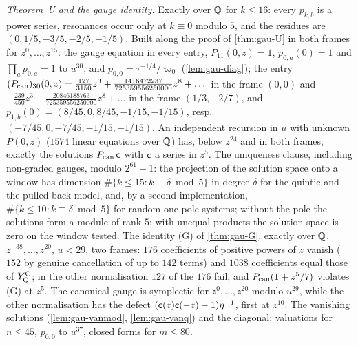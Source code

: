\emph{Theorem~U and the gauge identity.} Exactly over $\mathbb{Q}$ for $k\leq 16$: every $p_{k,b}$ is a power series, resonances occur only at $k\equiv 0$ modulo $5$, and the residues are $(0,1/5,-3/5,-2/5,-1/5)$. Built along the proof of \cref{thm:gau-U} in both frames for $z^0,\dots,z^{15}$: the gauge equation in every entry, $P_{11}(0,z)=1$, $p_{0,a}(0)=1$ and $\prod_ap_{0,a}=1$ to $u^{30}$, and $p_{0,0}=\tau^{-1/4}/\varpi_0$ (\cref{lem:gau-diag}); the entry $(P_{\mathrm{can}})_{30}(0,z)=\tfrac{127}{3150}z^3+\tfrac{1416472237}{725359556250000}z^8+\dots$ in the frame $(0,0)$ and $-\tfrac{239}{450}z^3-\tfrac{20846188763}{725359556250000}z^8+\dots$ in the frame $(1/3,-2/7)$, and $p_{1,b}(0)=(8/45,0,8/45,-1/15,-1/15)$, resp.\ $(-7/45,0,-7/45,-1/15,-1/15)$. An independent recursion in $u$ with unknown $P(0,z)$ ($1574$ linear equations over $\mathbb{Q}$) has, below $z^{24}$ and in both frames, exactly the solutions $P_{\mathrm{can}}\,\mathsf{c}$ with $\mathsf{c}$ a series in $z^5$. The uniqueness clause, including non-graded gauges, modulo $2^{61}-1$: the projection of the solution space onto a window has dimension $\#\{k\leq 15:k\equiv\delta\bmod 5\}$ in degree $\delta$ for the quintic and the pulled-back model, and, by a second implementation, $\#\{k\leq 10:k\equiv\delta\bmod 5\}$ for random one-pole systems; without the pole the solutions form a module of rank $5$; with unequal products the solution space is zero on the window tested. The identity (G) of \cref{thm:gau-G}, exactly over $\mathbb{Q}$, $z^{-38},\dots,z^{20}$, $u<29$, two frames: $176$ coefficients of positive powers of $z$ vanish ($152$ by genuine cancellation of up to $142$ terms) and $1038$ coefficients equal those of $Y^{\mathrm{C}}_{\mathrm{Q}}$; in the other normalisation $127$ of the $176$ fail, and $P_{\mathrm{can}}(1+z^5/7)$ violates (G) at $z^5$. The canonical gauge is symplectic for $z^0,\dots,z^{20}$ modulo $u^{29}$, while the other normalisation has the defect $(\mathsf{c}(z)\mathsf{c}(-z)-1)\eta^{-1}$, first at $z^{10}$. The vanishing solutions (\cref{lem:gau-vanmod}, \cref{lem:gau-vanq}) and the diagonal: valuations for $n\leq 45$, $p_{0,0}$ to $u^{37}$, closed forms for $m\leq 80$.

